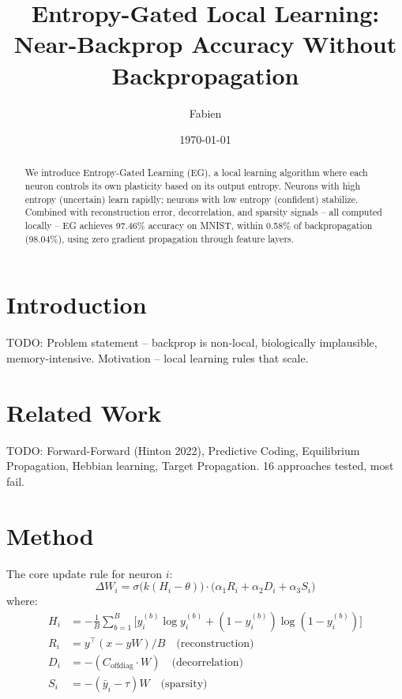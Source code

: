 \documentclass[11pt]{article}
\title{Entropy-Gated Local Learning: Near-Backprop Accuracy Without Backpropagation}
\author{Fabien}
\date{\today}
\begin{document}
\maketitle

\begin{abstract}
We introduce Entropy-Gated Learning (EG), a local learning algorithm where each neuron
controls its own plasticity based on its output entropy. Neurons with high entropy
(uncertain) learn rapidly; neurons with low entropy (confident) stabilize. Combined with
reconstruction error, decorrelation, and sparsity signals -- all computed locally -- EG
achieves 97.46\% accuracy on MNIST, within 0.58\% of backpropagation (98.04\%), using
zero gradient propagation through feature layers.
\end{abstract}

\section{Introduction}
TODO: Problem statement -- backprop is non-local, biologically implausible, memory-intensive.
Motivation -- local learning rules that scale.

\section{Related Work}
TODO: Forward-Forward (Hinton 2022), Predictive Coding, Equilibrium Propagation,
Hebbian learning, Target Propagation. 16 approaches tested, most fail.

\section{Method}

The core update rule for neuron $i$:
\begin{equation}
\Delta W_i = \sigma\bigl(k(H_i - \theta)\bigr) \cdot \bigl(\alpha_1 R_i + \alpha_2 D_i + \alpha_3 S_i\bigr)
\end{equation}
where:
\begin{align}
H_i &= -\frac{1}{B}\sum_{b=1}^{B}\bigl[y_i^{(b)}\log y_i^{(b)} + (1-y_i^{(b)})\log(1-y_i^{(b)})\bigr] \\
R_i &= y^\top(x - yW)/B \quad \text{(reconstruction)} \\
D_i &= -(C_{\text{offdiag}} \cdot W) \quad \text{(decorrelation)} \\
S_i &= -(\bar{y}_i - \tau)W \quad \text{(sparsity)}
\end{align}
\end{document}
